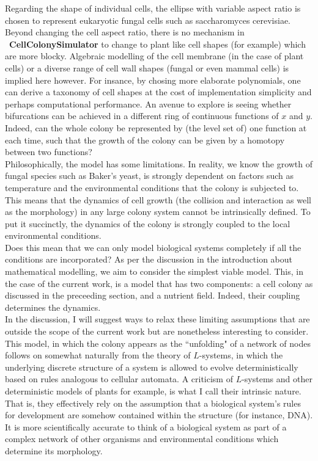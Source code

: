 Regarding the shape of individual cells, 
the ellipse with variable aspect ratio is chosen to represent eukaryotic
fungal cells such as saccharomyces cerevisiae. Beyond changing 
the cell aspect ratio, there is no mechanism in \
\textbf{CellColonySimulator}
to change to plant like cell shapes (for example) which are more blocky.
Algebraic modelling of the cell membrane (in the case of plant cells) or
a diverse range of cell wall shapes (fungal or even mammal cells)
is implied here however. For insance, by chosing more elaborate
polynomials, one can derive a taxonomy of cell shapes at the cost of 
implementation simplicity and perhaps computational performance. 
An avenue to explore is seeing whether bifurcations
can be achieved in a different ring of continuous functions of $x$ and $y$.
Indeed, can the whole colony be represented by (the level set of) one function at each time,
such that the growth of the colony can be given by a homotopy 
between two functions?
\\

Philosophically, the model has some limitations. In reality, we know the growth
of fungal species such as Baker's yeast, is strongly dependent on factors such as temperature
and the environmental conditions that the colony is subjected to. This means 
that the dynamics of cell growth (the collision and interaction as well as the morphology) in 
any large colony system cannot be intrinsically defined. To put it succinctly, the dynamics of 
the colony is strongly coupled to the local environmental conditions.
\\

Does this mean that we can only model biological systems completely if all the conditions 
are incorporated? As per the discussion in the introduction about mathematical modelling,
we aim to consider the simplest viable model. This, in the case of the current work, 
is a model that has two components: a cell colony as discussed in the preceeding section, and 
a nutrient field. Indeed, their coupling determines the dynamics. 
\\

In the discussion, I will suggest ways to relax these limiting assumptions that
are outside the scope of the current work but are nonetheless interesting to consider.
\\

This model, in which the colony appears as the ``unfolding" of a network of nodes
follows on somewhat naturally from the theory of $L$-systems, in which the underlying 
discrete structure of a system is allowed to evolve deterministically based on rules
analogous to cellular automata. A criticism of $L$-systems and other deterministic models
of plants for example, is what I call their intrinsic nature. That is, they effectively
rely on the assumption that a biological system's rules for development are somehow contained
within the structure (for instance, DNA). It is more 
scientifically accurate to think of a biological system as part of a complex network 
of other organisms and environmental conditions which determine its morphology.
\\

